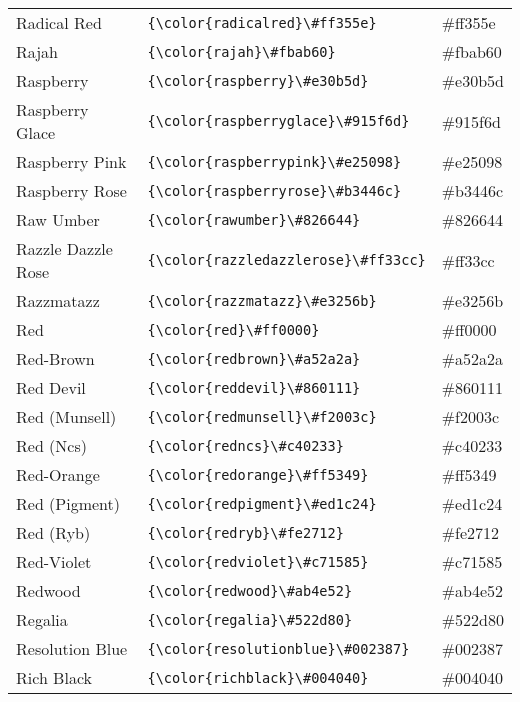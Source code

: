 \documentclass[9.5pt]{article}
\begin{document}
\begin{longtable}{l | l | l}
	Radical Red & \verb!{\color{radicalred}\#ff355e}! & {\color{radicalred}\#ff355e}\\
	Rajah & \verb!{\color{rajah}\#fbab60}! & {\color{rajah}\#fbab60}\\
	Raspberry & \verb!{\color{raspberry}\#e30b5d}! & {\color{raspberry}\#e30b5d}\\
	Raspberry Glace & \verb!{\color{raspberryglace}\#915f6d}! & {\color{raspberryglace}\#915f6d}\\
	Raspberry Pink & \verb!{\color{raspberrypink}\#e25098}! & {\color{raspberrypink}\#e25098}\\
	Raspberry Rose & \verb!{\color{raspberryrose}\#b3446c}! & {\color{raspberryrose}\#b3446c}\\
	Raw Umber & \verb!{\color{rawumber}\#826644}! & {\color{rawumber}\#826644}\\
	Razzle Dazzle Rose & \verb!{\color{razzledazzlerose}\#ff33cc}! & {\color{razzledazzlerose}\#ff33cc}\\
	Razzmatazz & \verb!{\color{razzmatazz}\#e3256b}! & {\color{razzmatazz}\#e3256b}\\
	Red & \verb!{\color{red}\#ff0000}! & {\color{red}\#ff0000}\\
	Red-Brown & \verb!{\color{redbrown}\#a52a2a}! & {\color{redbrown}\#a52a2a}\\
	Red Devil & \verb!{\color{reddevil}\#860111}! & {\color{reddevil}\#860111}\\
	Red (Munsell) & \verb!{\color{redmunsell}\#f2003c}! & {\color{redmunsell}\#f2003c}\\
	Red (Ncs) & \verb!{\color{redncs}\#c40233}! & {\color{redncs}\#c40233}\\
	Red-Orange & \verb!{\color{redorange}\#ff5349}! & {\color{redorange}\#ff5349}\\
	Red (Pigment) & \verb!{\color{redpigment}\#ed1c24}! & {\color{redpigment}\#ed1c24}\\
	Red (Ryb) & \verb!{\color{redryb}\#fe2712}! & {\color{redryb}\#fe2712}\\
	Red-Violet & \verb!{\color{redviolet}\#c71585}! & {\color{redviolet}\#c71585}\\
	Redwood & \verb!{\color{redwood}\#ab4e52}! & {\color{redwood}\#ab4e52}\\
	Regalia & \verb!{\color{regalia}\#522d80}! & {\color{regalia}\#522d80}\\
	Resolution Blue & \verb!{\color{resolutionblue}\#002387}! & {\color{resolutionblue}\#002387}\\
	Rich Black & \verb!{\color{richblack}\#004040}! & {\color{richblack}\#004040}\\

\end{longtable}
\end{document}
